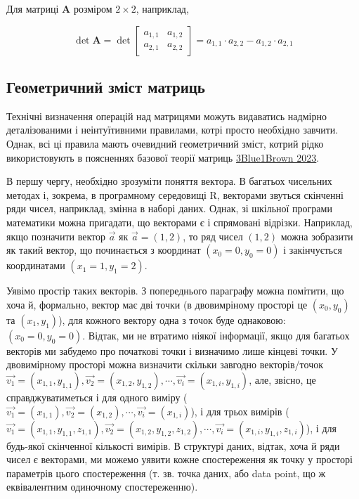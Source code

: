 \documentclass[
  11pt,
]{book}
\begin{document}
Для матриці \(\mathbf{A}\) розміром \(2 \times 2\), наприклад,

\[\det \mathbf{A} = \det \begin{bmatrix}
a_{1, 1} & a_{1, 2} \\
a_{2, 1} & a_{2, 2}
\end{bmatrix} = a_{1, 1} \cdot a_{2, 2} - a_{1, 2} \cdot a_{2, 1}\]

\subsection{Геометричний зміст матриць}\label{matrices_art}

Технічні визначення операцій над матрицями можуть видаватись надмірно деталізованими і неінтуїтивними правилами, котрі просто необхідно завчити. Однак, всі ці правила мають очевидний геометричний зміст, котрий рідко використовують в поясненнях базової теорії матриць \href{https://youtube.com/playlist?list=PLZHQObOWTQDPD3MizzM2xVFitgF8hE_ab}{3Blue1Brown 2023}.

В першу чергу, необхідно зрозуміти поняття вектора. В багатьох чисельних методах і, зокрема, в програмному середовищі R, векторами звуться скінченні ряди чисел, наприклад, змінна в наборі даних. Однак, зі шкільної програми математики можна пригадати, що векторами є і спрямовані відрізки. Наприклад, якщо позначити вектор \(\vec{a}\) як \(\vec{a} = (1, 2)\), то ряд чисел \((1, 2)\) можна зобразити як такий вектор, що починається з координат \((x_0 = 0, y_0 = 0)\) і закінчується координатами \((x_1 = 1, y_1 = 2)\).

Уявімо простір таких векторів. З попереднього параграфу можна помітити, що хоча й, формально, вектор має дві точки (в двовимріному просторі це \((x_0, y_0)\) та \((x_1, y_1)\)), для кожного вектору одна з точок буде однаковою: \((x_0 = 0, y_0 = 0)\). Відтак, ми не втратимо ніякої інформації, якщо для багатьох векторів ми забудемо про початкові точки і визначимо лише кінцеві точки. У двовимірному просторі можна визначити скільки завгодно векторів/точок \(\vec{v_1} = (x_{1, 1}, y_{1, 1}), \vec{v_2} = (x_{1, 2}, y_{1, 2}), \cdots, \vec{v_i} = (x_{1, i}, y_{1, i})\), але, звісно, це справджуватиметься і для одного виміру (\(\vec{v_1} = (x_{1, 1}), \vec{v_2} = (x_{1, 2}), \cdots, \vec{v_i} = (x_{1, i})\)), і для трьох вимірів (\(\vec{v_1} = (x_{1, 1}, y_{1, 1}, z_{1, 1}), \vec{v_2} = (x_{1, 2}, y_{1, 2}, z_{1, 2}), \cdots, \vec{v_i} = (x_{1, i}, y_{1, i}, z_{1, i})\)), і для будь-якої скінченної кількості вимірів. В структурі даних, відтак, хоча й ряди чисел є векторами, ми можемо уявити кожне спостереження як точку у просторі параметрів цього спостереження (т. зв. точка даних, або data point, що ж еквівалентним одиночному спостереженню).
\end{document}
